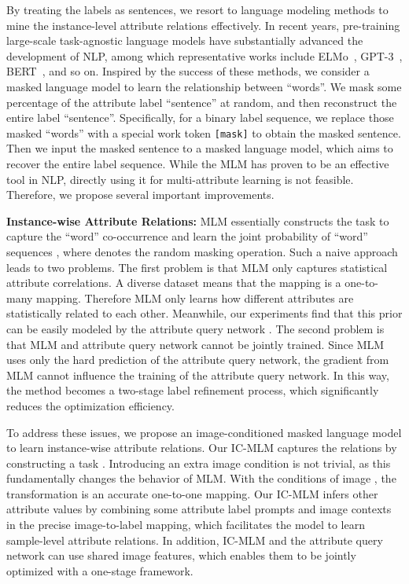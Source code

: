 \documentclass[runningheads]{llncs}
\begin{document}
By treating the labels as sentences, we resort to language modeling methods to mine the instance-level attribute relations effectively. In recent years, pre-training large-scale task-agnostic language models have substantially advanced the development of NLP, among which representative works include ELMo~\cite{peters2018deep}, GPT-3~\cite{brown2020language}, BERT~\cite{devlin2018bert}, and so on. Inspired by the success of these methods, we consider a masked language model to learn the relationship between ``words''. We mask some percentage of the attribute label ``sentence''  at random, and then reconstruct the entire label ``sentence''.  Specifically, for a binary label sequence, we replace those masked ``words'' with a special work token \texttt{[mask]} to obtain the masked sentence. Then we input the masked sentence to a masked language model, which aims to recover the entire label sequence. While the MLM has proven to be an effective tool in NLP, directly using it for multi-attribute learning is not feasible. Therefore, we propose several important improvements.


\textbf{Instance-wise Attribute Relations:} MLM essentially constructs the task  to capture the ``word'' co-occurrence and learn the joint probability of ``word'' sequences , where  denotes the random masking operation. Such a naive approach leads to two problems. The first problem is that MLM only captures statistical attribute correlations. A diverse dataset means that the mapping  is a one-to-many mapping. Therefore MLM only learns how different attributes are statistically related to each other. Meanwhile, our experiments find that this prior can be easily modeled by the attribute query network . The second problem is that MLM and attribute query network cannot be jointly trained. Since MLM uses only the hard prediction of the attribute query network, the gradient from MLM cannot influence the training of the attribute query network. In this way, the method becomes a two-stage label refinement process, which significantly reduces the optimization efficiency.

To address these issues, we propose an image-conditioned masked language model to learn instance-wise attribute relations. Our IC-MLM captures the relations by constructing a task . Introducing an extra image condition is not trivial, as this fundamentally changes the behavior of MLM. With the conditions of image , the transformation  is an accurate one-to-one mapping. Our IC-MLM infers other attribute values by combining some attribute label prompts and image contexts in the precise image-to-label mapping, which facilitates the model to learn sample-level attribute relations. In addition, IC-MLM and the attribute query network can use shared image features, which enables them to be jointly optimized with a one-stage framework.
\end{document}
